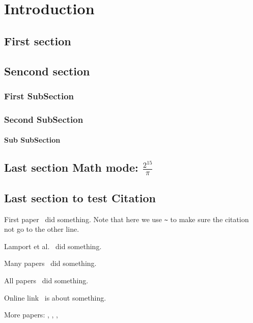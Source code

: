 \chapter{Introduction \protect\\ }
\lipsum[2]

\section{First section}
\lipsum[3]

\section{Sencond  section}
\lipsum[3]
\subsection{First SubSection}
\lipsum[3]
\subsection{Second SubSection}
\lipsum[3]
\subsubsection{Sub SubSection}
\lipsum[3]	 
	 
\section{Last section Math mode: $\frac{2^{15}}{\pi}$} 
\lipsum[3]
\section{Last section to test Citation} 

First paper~\cite{goossens1994latex} did something. Note that here we use \verb|~| to make sure the citation not go to the other line. 

Lamport et al.~\cite{lamport1994latex} did something.

Many papers~\cite{makuuchi2000progress,yassin1994latex} did something.


All papers~\cite{makuuchi2000progress,yassin1994latex,
	goossens1994latex,lamport1994latex} did something.

Online link~\cite{onlineWindows} is about something.

More papers: \cite{colu92}, \cite{goossens1994latex}, \cite{jame76}, \cite{colu92,phil99,gree00,smit54}
